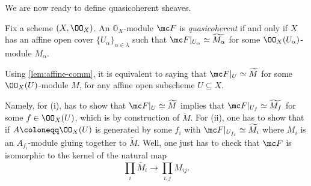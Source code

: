 \documentclass[../notes.tex]{subfiles}
\begin{document}
We are now ready to define quasicoherent sheaves.
\begin{definition}
	Fix a scheme $(X,\OO_X)$. An $\mathbb O_X$-module $\mc F$ is \textit{quasicoherent} if and only if $X$ has an affine open cover $\{U_\alpha\}_{\alpha\in\lambda}$ such that $\mc F|_{U_\alpha}\simeq\widetilde{M_\alpha}$ for some $\OO_X(U_\alpha)$-module $M_\alpha$.
\end{definition}
Using \autoref{lem:affine-comm}, it is equivalent to saying that $\mc F|_U\simeq\widetilde M$ for some $\OO_X(U)$-module $M$, for any affine open subscheme $U\subseteq X$.

Namely, for (i), has to show that $\mc F|_U\simeq\widetilde M$ implies that $\mc F|_{U_f}\simeq\widetilde{M_f}$ for some $f\in\OO_X(U)$, which is by construction of $\widetilde M$. For (ii), one has to show that if $A\coloneqq\OO_X(U)$ is generated by some $f_i$ with $\mc F|_{U_{f_i}}\simeq\widetilde{M_i}$ where $M_i$ is an $A_{f_i}$-module gluing together to $\widetilde M$. Well, one just has to check that $\mc F$ is isomorphic to the kernel of the natural map
\[\prod_i\widetilde{M_i}\to\prod_{i,j}M_{ij}.\]
\end{document}
